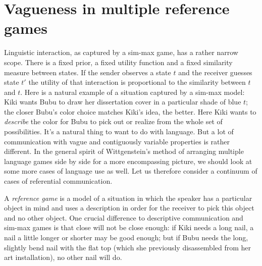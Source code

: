 \documentclass[a4paper]{article}
\begin{document}
\section{Vagueness in multiple reference games}
\label{sec:referential-vagueness}

Linguistic interaction, as captured by a sim-max game, has a rather narrow scope. There is a fixed prior, a fixed utility function and a fixed similarity measure between states. 
If the sender observes a state $t$ and the receiver guesses state $t'$ the utility of that interaction is proportional to the similarity between $t$ and $t$. 
Here is a natural example of a situation captured by a sim-max model: Kiki wants Bubu to draw her dissertation cover in a particular shade of blue $t$; the closer Bubu's color choice matches Kiki's idea, the better. Here Kiki wants to \emph{describe} the color for Bubu to pick out or realize from the whole set of possibilities. 
It's a natural thing to want to do with language. 
But a lot of communication with vague and contiguously variable properties is rather different. 
In the general spirit of Wittgenstein's method of arranging multiple language games side by side for a more encompassing picture, we should look at some more cases of language use as well. 
Let us therefore consider a continuum of cases of referential communication.

A \emph{reference game} is a model of a situation in which the speaker has a particular object in mind and uses a description in order for the receiver to pick this object and no other object. 
One crucial difference to descriptive communication and sim-max games is that close will not be close enough: if Kiki needs a long nail, a nail a little longer or shorter may be good enough; but if Bubu needs the long, slightly bend nail with the flat top (which she previously disassembled from her art installation), no other nail will do. 
\end{document}
